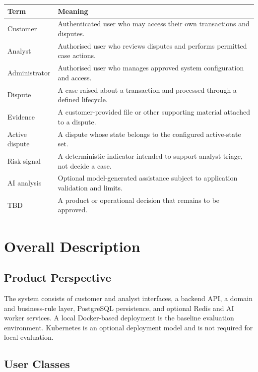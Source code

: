 \documentclass[11pt,a4paper]{article}
\begin{document}
\begin{longtable}{@{}p{}p{}@{}}
\textbf{Term} & \textbf{Meaning} \\
\hline
Customer & Authenticated user who may access their own transactions and disputes. \\
Analyst & Authorised user who reviews disputes and performs permitted case actions. \\
Administrator & Authorised user who manages approved system configuration and access. \\
Dispute & A case raised about a transaction and processed through a defined lifecycle. \\
Evidence & A customer-provided file or other supporting material attached to a dispute. \\
Active dispute & A dispute whose state belongs to the configured active-state set. \\
Risk signal & A deterministic indicator intended to support analyst triage, not decide a case. \\
AI analysis & Optional model-generated assistance subject to application validation and limits. \\
TBD & A product or operational decision that remains to be approved. \\
\end{longtable}

\section{Overall Description}

\subsection{Product Perspective}

The system consists of customer and analyst interfaces, a backend API,
a domain and business-rule layer, PostgreSQL persistence, and optional
Redis and AI worker services. A local Docker-based deployment is the
baseline evaluation environment. Kubernetes is an optional deployment
model and is not required for local evaluation.

\subsection{User Classes}
\end{document}
